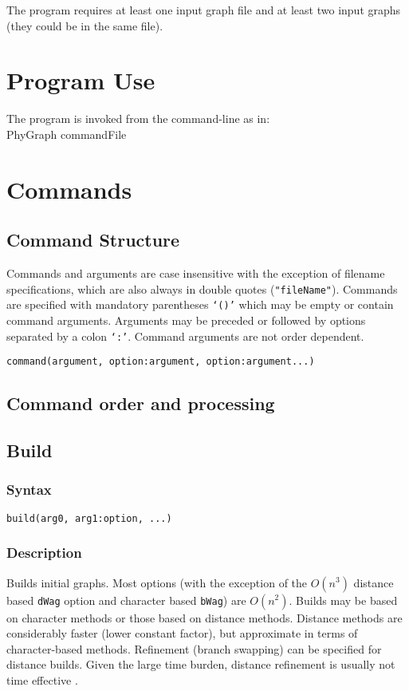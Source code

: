 \documentclass[11pt]{article}
\begin{document}
	

	
	The program requires at least one input graph file and at least two input graphs (they could be in the same file).

	
	\section{Program Use}
	The program is invoked from the command-line as in:\\
	PhyGraph commandFile\\
	
	\section{Commands}
		\subsection{Command Structure}
		Commands and arguments are case insensitive with the exception of filename specifications, which are also 
		always in double quotes (\texttt{"fileName"}).  Commands are specified with mandatory parentheses \texttt{`()'} which may be empty or
		contain command arguments. Arguments may be preceded or followed by options separated by a colon \texttt{`:'}.  Command arguments are not 
		order dependent.
		
		\bigskip
		\texttt{command(argument, option:argument, option:argument...)}
		\subsection{Command order and processing}
	
	
	
	\subsection{Build}
		\subsubsection{Syntax}
		\texttt{build(arg0, arg1:option, ...)}
		\subsubsection{Description}
		Builds initial graphs.  Most options (with the exception of the $O(n^3)$ distance based \texttt{dWag} option and character based \texttt{bWag})
		are $O(n^2)$.  Builds may be based on character methods or those based on distance methods.  Distance methods are considerably faster 
		(lower constant factor), but approximate in terms of character-based methods.  Refinement (branch swapping) can be specified
		for distance builds.  Given the large time burden, distance refinement is usually not time effective \citep{Wheeler2021}.
\end{document}

